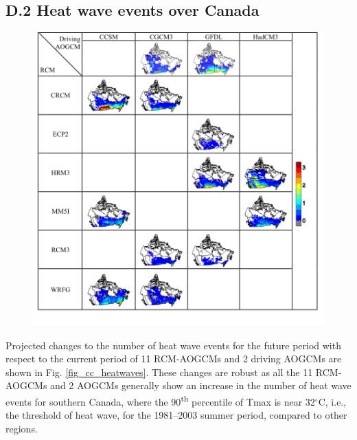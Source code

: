 \documentclass[a0,landscape]{a0poster}
\begin{document}
\begin{multicols*}{4}
\subsection*{D.2 Heat wave events over Canada}
\begin{minipage}[t]{\linewidth}
  \begingroup
  \setlength{\columnsep}{30pt}
  \begin{figure}
  \includegraphics[width=\linewidth]{cc_heatwaves}
  \end{figure}
  Projected changes to the number of heat wave events for the future period with
  respect to the current period of 11 RCM-AOGCMs and 2 driving AOGCMs are shown in
  Fig. \ref{fig_cc_heatwaves}. These changes are robust as all the 11 RCM-AOGCMs and 2 AOGCMs generally
  show an increase in the number of heat wave events for southern Canada, where
  the 90\textsuperscript{th} percentile of Tmax is near 32${^\circ}$C, i.e., the threshold of heat wave, for
  the 1981–2003 summer period, compared to other regions.


\end{minipage}
\end{multicols*}
\end{document}
